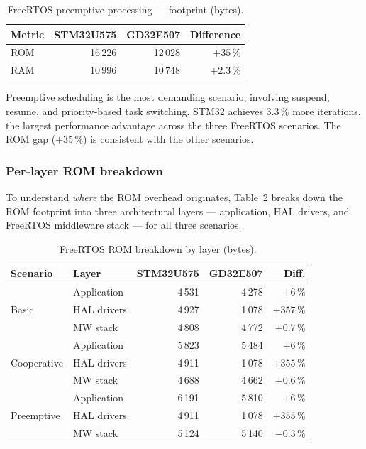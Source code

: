 \begin{table}[H]
  \centering
  \caption{FreeRTOS preemptive processing --- footprint (bytes).}
  \label{tab:gd32-freertos-preemptive-fp}
  \begin{tabular}{l r r r}
    \toprule
    \textbf{Metric} & \textbf{STM32U575} & \textbf{GD32E507} & \textbf{Difference} \\
    \midrule
    ROM & 16\,226 & 12\,028 & $+35\,\%$ \\
    RAM & 10\,996 & 10\,748 & $+2.3\,\%$ \\
    \bottomrule
  \end{tabular}
\end{table}

Preemptive scheduling is the most demanding scenario, involving suspend, resume, and
priority-based task switching. STM32 achieves 3.3\,\% more iterations, the largest
performance advantage across the three FreeRTOS scenarios. The ROM gap ($+35\,\%$) is
consistent with the other scenarios.

\subsubsection{Per-layer ROM breakdown}
\label{sec:gd32-freertos-rom-breakdown}

To understand \emph{where} the ROM overhead originates, Table~\ref{tab:gd32-freertos-rom}
breaks down the ROM footprint into three architectural layers --- application, HAL drivers,
and FreeRTOS middleware stack --- for all three scenarios.

\begin{table}[H]
  \centering
  \caption{FreeRTOS ROM breakdown by layer (bytes).}
  \label{tab:gd32-freertos-rom}
  \begin{tabular}{l l r r r}
    \toprule
    \textbf{Scenario} & \textbf{Layer} & \textbf{STM32U575} & \textbf{GD32E507}
        & \textbf{Diff.} \\
    \midrule
    \multirow{3}{*}{Basic}
      & Application & 4\,531  & 4\,278 & $+6\,\%$ \\
      & HAL drivers & 4\,927  & 1\,078 & $+357\,\%$ \\
      & MW stack    & 4\,808  & 4\,772 & $+0.7\,\%$ \\
    \midrule
    \multirow{3}{*}{Cooperative}
      & Application & 5\,823  & 5\,484 & $+6\,\%$ \\
      & HAL drivers & 4\,911  & 1\,078 & $+355\,\%$ \\
      & MW stack    & 4\,688  & 4\,662 & $+0.6\,\%$ \\
    \midrule
    \multirow{3}{*}{Preemptive}
      & Application & 6\,191  & 5\,810 & $+6\,\%$ \\
      & HAL drivers & 4\,911  & 1\,078 & $+355\,\%$ \\
      & MW stack    & 5\,124  & 5\,140 & $-0.3\,\%$ \\
    \bottomrule
  \end{tabular}
\end{table}

